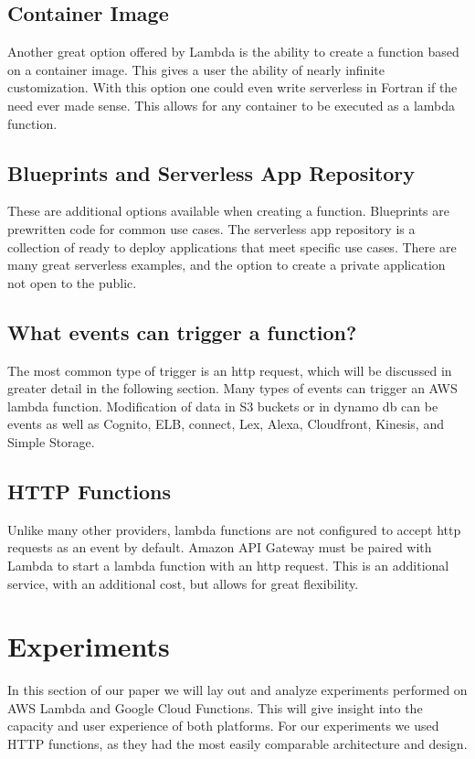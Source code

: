 \documentclass[10pt, conference]{IEEEtran}
\begin{document}
\subsection{Container Image}
Another great option offered by Lambda is the ability to create a function based on a container image. This gives a user the ability of nearly infinite customization. With this option one could even write serverless in Fortran if the need ever made sense. This allows for any container to be executed as a lambda function. 

\subsection{Blueprints and Serverless App Repository}
These are additional options available when creating a function. Blueprints are prewritten code for common use cases. The serverless app repository is a collection of ready to deploy applications that meet specific use cases. There are many great serverless examples, and the option to create a private application not open to the public. 

\subsection{What events can trigger a function?}
The most common type of trigger is an http request, which will be discussed in greater detail in the following section. Many types of events can trigger an AWS lambda function. Modification of data in S3 buckets or in dynamo db can be events as well as Cognito, ELB, connect, Lex, Alexa, Cloudfront, Kinesis, and Simple Storage. 

\subsection{HTTP Functions}
Unlike many other providers, lambda functions are not configured to accept http requests as an event by default. Amazon API Gateway must be paired with Lambda to start a lambda function with an http request. This is an additional service, with an additional cost, but allows for great flexibility.

\section{ Experiments}
In this section of our paper we will lay out and analyze experiments performed on AWS Lambda and Google Cloud Functions. This will give insight into the capacity and user experience of both platforms. For our experiments we used HTTP functions, as they had the most easily comparable architecture and design. 
\end{document}
